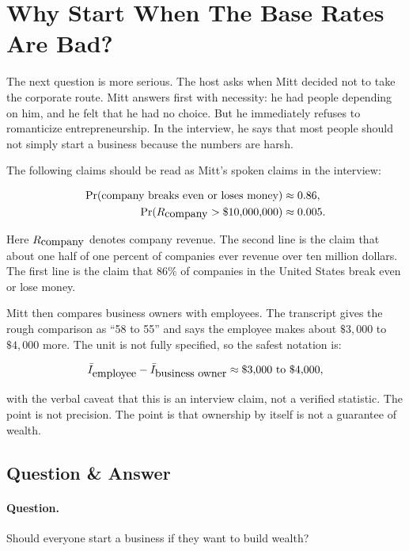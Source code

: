 \section{Why Start When The Base Rates Are Bad?}

The next question is more serious. The host asks when Mitt decided not to take the corporate route. Mitt answers first with necessity: he had people depending on him, and he felt that he had no choice. But he immediately refuses to romanticize entrepreneurship. In the interview, he says that most people should not simply start a business because the numbers are harsh.

The following claims should be read as Mitt's spoken claims in the interview:

\begin{align}
  \Pr(\hbox{company breaks even or loses money}) &\approx 0.86,\\
  \Pr(R_{\hbox{company}} > \$10{,}000{,}000) &\approx 0.005.
\end{align}

Here \(R_{\hbox{company}}\) denotes company revenue. The second line is the claim that about one half of one percent of companies ever revenue over ten million dollars. The first line is the claim that \(86\%\) of companies in the United States break even or lose money.

Mitt then compares business owners with employees. The transcript gives the rough comparison as ``58 to 55'' and says the employee makes about \(\$3{,}000\) to \(\$4{,}000\) more. The unit is not fully specified, so the safest notation is:

\begin{equation}
  \bar I_{\hbox{employee}}-\bar I_{\hbox{business owner}}
  \approx \$3{,}000 \hbox{ to } \$4{,}000,
\end{equation}

with the verbal caveat that this is an interview claim, not a verified statistic. The point is not precision. The point is that ownership by itself is not a guarantee of wealth.

\subsection{Question \& Answer}

\paragraph{Question.}
Should everyone start a business if they want to build wealth?

